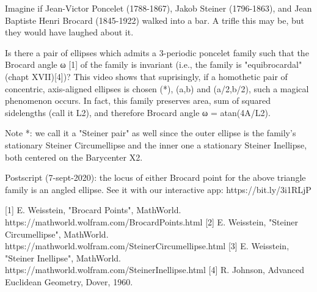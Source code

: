 Imagine if Jean-Victor Poncelet (1788-1867), Jakob Steiner (1796-1863), and Jean Baptiste Henri Brocard (1845-1922) walked into a bar. A trifle this may be, but they would have laughed about it.

Is there a pair of ellipses which admits a 3-periodic poncelet family such that the Brocard angle ω [1] of the family is invariant (i.e., the family is "equibrocardal" (chapt XVII)[4])? This video shows that suprisingly, if a homothetic pair of concentric, axis-aligned ellipses is chosen (*), (a,b) and (a/2,b/2), such a magical phenomenon occurs. In fact, this family preserves area, sum of squared sidelengths (call it L2), and therefore Brocard angle ω = atan(4A/L2).

Note *: we call it a "Steiner pair" as well since the outer ellipse is the family's stationary Steiner Circumellipse and the inner one a stationary Steiner Inellipse, both centered on the Barycenter X2. 

Postscript (7-sept-2020): the locus of either Brocard point for the above triangle family is an angled ellipse. See it with our interactive app: https://bit.ly/3i1RLjP

[1] E. Weisstein, "Brocard Points", MathWorld. https://mathworld.wolfram.com/BrocardPoints.html
[2] E. Weisstein, "Steiner Circumellipse",  MathWorld. https://mathworld.wolfram.com/SteinerCircumellipse.html
[3] E. Weisstein, "Steiner Inellipse",  MathWorld. https://mathworld.wolfram.com/SteinerInellipse.html
[4] R. Johnson, Advanced Euclidean Geometry, Dover, 1960.